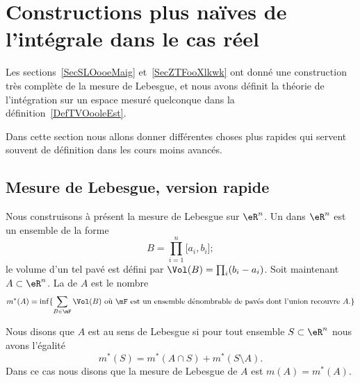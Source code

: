 \section{Constructions plus naïves de l'intégrale dans le cas réel}

Les sections~\ref{SecSLOooeMaig} et~\ref{SecZTFooXlkwk} ont donné une construction très complète de la mesure de Lebesgue, et nous avons définit la théorie de l'intégration sur un espace mesuré quelconque dans la définition~\ref{DefTVOooleEst}.

Dans cette section nous allons donner différentes choses plus rapides qui servent souvent de définition dans les cours moins avancés.

\subsection{Mesure de Lebesgue, version rapide}

Nous construisons à présent la mesure de Lebesgue sur \( \eR^n\). Un  dans \( \eR^n\) est un ensemble de la forme
\begin{equation}
	B=\prod_{i=1}^n\mathopen[ a_i , b_i \mathclose];
\end{equation}
le volume d'un tel pavé est défini par \( \Vol(B)=\prod_i(b_i-a_i)\). Soit maintenant \( A\subset \eR^n\). La  de \( A\) est le nombre
\begin{equation}
	m^*(A)=\inf\{ \sum_{B\in\mF}\Vol(B)\text{ où } \mF\text{ est un ensemble dénombrable de pavés dont l'union recouvre } A\text{.} \}
\end{equation}

\begin{definition}  \label{DefKTzOlyH}
	Nous disons que \( A\) est  au sens de Lebesgue si pour tout ensemble \( S\subset \eR^n\) nous avons l'égalité
	\begin{equation}
		m^*(S)=m^*(A\cap S)+m^*(S\setminus A).
	\end{equation}
	Dans ce cas nous disons que la mesure de Lebesgue de \( A\) est \( m(A)=m^*(A)\).
\end{definition}

